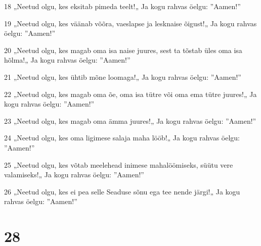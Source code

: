\par 18 „Neetud olgu, kes eksitab pimeda teelt!„ Ja kogu rahvas öelgu: ”Aamen!”
\par 19 „Neetud olgu, kes väänab võõra, vaeslapse ja lesknaise õigust!„ Ja kogu rahvas öelgu: ”Aamen!”
\par 20 „Neetud olgu, kes magab oma isa naise juures, sest ta tõstab üles oma isa hõlma!„ Ja kogu rahvas öelgu: ”Aamen!”
\par 21 „Neetud olgu, kes ühtib mõne loomaga!„ Ja kogu rahvas öelgu: ”Aamen!”
\par 22 „Neetud olgu, kes magab oma õe, oma isa tütre või oma ema tütre juures!„ Ja kogu rahvas öelgu: ”Aamen!”
\par 23 „Neetud olgu, kes magab oma ämma juures!„ Ja kogu rahvas öelgu: ”Aamen!”
\par 24 „Neetud olgu, kes oma ligimese salaja maha lööb!„ Ja kogu rahvas öelgu: ”Aamen!”
\par 25 „Neetud olgu, kes võtab meelehead inimese mahalöömiseks, süütu vere valamiseks!„ Ja kogu rahvas öelgu: ”Aamen!”
\par 26 „Neetud olgu, kes ei pea selle Seaduse sõnu ega tee nende järgi!„ Ja kogu rahvas öelgu: ”Aamen!”

\chapter{28}

